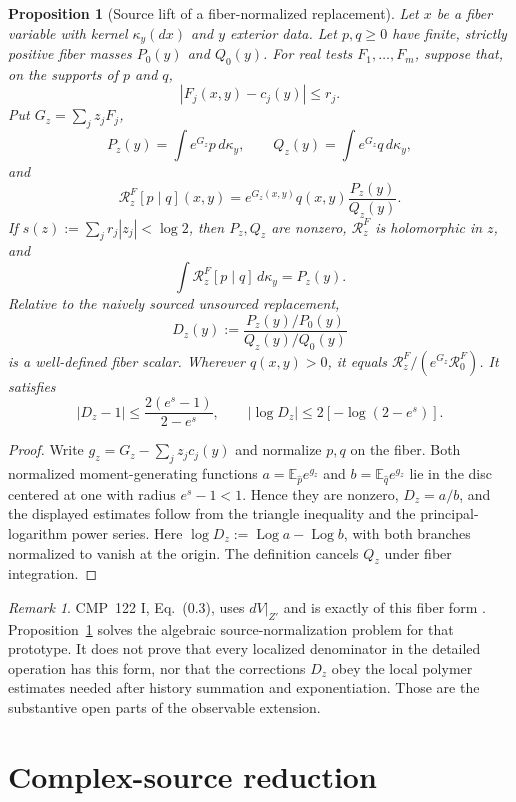 \documentclass[11pt]{article}
\newtheorem{proposition}[theorem]{Proposition}
\theoremstyle{definition}
\theoremstyle{remark}
\newtheorem{remark}[theorem]{Remark}
\begin{document}
\begin{proposition}[Source lift of a fiber-normalized replacement]
\label{prop:rfiber}
Let $x$ be a fiber variable with kernel $\kappa_y(dx)$ and $y$ exterior data.
Let $p,q\ge0$ have finite, strictly positive fiber masses $P_0(y)$ and
$Q_0(y)$.  For real tests $F_1,\ldots,F_m$, suppose that, on the supports of
$p$ and $q$,
\[
 |F_j(x,y)-c_j(y)|\le r_j .
\]
Put $G_z=\sum_jz_jF_j$,
\[
 P_z(y)=\int e^{G_z}p\,d\kappa_y,\qquad
 Q_z(y)=\int e^{G_z}q\,d\kappa_y,
\]
and
\[
 \mathcal R^F_z[p\mid q](x,y)
 =e^{G_z(x,y)}q(x,y)\frac{P_z(y)}{Q_z(y)}.
\]
If $s(z):=\sum_jr_j|z_j|<\log2$, then $P_z,Q_z$ are nonzero,
$\mathcal R^F_z$ is holomorphic in $z$, and
\[
 \int \mathcal R^F_z[p\mid q]\,d\kappa_y=P_z(y).
\]
Relative to the naively sourced unsourced replacement,
\[
 D_z(y):=\frac{P_z(y)/P_0(y)}{Q_z(y)/Q_0(y)}
\]
is a well-defined fiber scalar.  Wherever $q(x,y)>0$, it equals
$\mathcal R^F_z/(e^{G_z}\mathcal R^F_0)$.  It satisfies
\[
 |D_z-1|\le\frac{2(e^s-1)}{2-e^s},\qquad
 |\log D_z|\le2[-\log(2-e^s)].
\]
\end{proposition}

\begin{proof}
Write $g_z=G_z-\sum_jz_jc_j(y)$ and normalize $p,q$ on the
fiber.  Both normalized moment-generating functions
$a=\mathbb E_{\widehat p}e^{g_z}$ and
$b=\mathbb E_{\widehat q}e^{g_z}$ lie in the disc centered at one with radius
$e^s-1<1$.  Hence they are nonzero, $D_z=a/b$, and the displayed estimates
follow from the triangle inequality and the principal-logarithm power series.
Here $\log D_z:=\operatorname{Log}a-\operatorname{Log}b$, with both branches
normalized to vanish at the origin.
The definition cancels $Q_z$ under fiber integration.
\end{proof}

\begin{remark}
CMP~122 I, Eq.~(0.3), uses $dV|_{Z'}$ and is exactly of this fiber form
\cite[p.~176]{Balaban1989LargeI}.  Proposition~\ref{prop:rfiber} solves the
algebraic source-normalization problem for that prototype.  It does not prove
that every localized denominator in the detailed operation has this form, nor
that the corrections $D_z$ obey the local polymer estimates needed after
history summation and exponentiation.  Those are the substantive open parts of
the observable extension.
\end{remark}

\section{Complex-source reduction}
\end{document}
